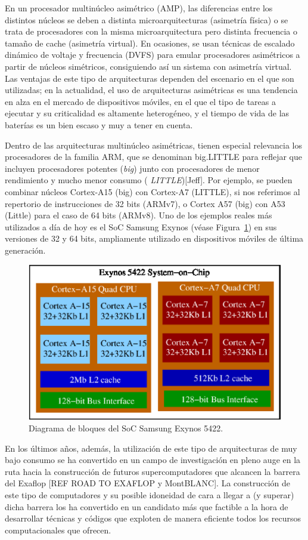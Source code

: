 En un procesador multinúcleo asimétrico (AMP), las diferencias entre los
distintos núcleos se deben a distinta microarquitecturas (asimetría física)
o se trata de procesadores con la misma microarquitectura pero distinta
frecuencia o tamaño de cache (asimetría virtual). En ocasiones, se usan
técnicas de escalado dinámico de voltaje y frecuencia (DVFS) para emular
procesadores asimétricos a partir de núcleos simétricos, consiguiendo así
un sistema con asimetría virtual. Las ventajas de este tipo de
arquitecturas dependen del escenario en el que son utilizadas; en la
actualidad, el uso de arquitecturas asimétricas es una tendencia en alza en
el mercado de dispositivos móviles, en el que el tipo de tareas a ejecutar y
su criticalidad es altamente heterogéneo, y el tiempo de vida de las
baterías es un bien escaso y muy a tener en cuenta.

Dentro de las arquitecturas multinúcleo asimétricas, tienen especial
relevancia los procesadores de la familia ARM, que se denominan big.LITTLE
para reflejar que incluyen procesadores potentes ({\em big}) junto con
procesadores de menor rendimiento y mucho menor consumo ({\em
  LITTLE})[Jeff]. Por ejemplo, se pueden combinar núcleos Cortex-A15 (big)
con Cortex-A7 (LITTLE), si nos referimos al repertorio de instrucciones de
32 bits (ARMv7), o Cortex A57 (big) con A53 (Little) para el caso de 64
bits (ARMv8). Uno de los ejemplos reales más utilizados a día de hoy es el
SoC Samsung Exynos (véase Figura~\ref{fig:exynos}) en sus versiones de 32 y
64 bits, ampliamente utilizado en dispositivos móviles de última
generación.

\begin{figure}[th!]
\begin{center}
\includegraphics[width=0.4\columnwidth]{Figures/Exynos.eps}
\end{center}
\caption{\label{fig:exynos} Diagrama de bloques del SoC Samsung Exynos 5422.}
\end{figure}

En los últimos años, además, la utilización de este tipo de arquitecturas de muy bajo consumo se ha
convertido en un campo de investigación en pleno auge en la ruta hacia la construcción de futuros
supercomputadores que alcancen la barrera del Exaflop [REF ROAD TO EXAFLOP y MontBLANC]. La construcción
de este tipo de computadores y su posible idoneidad de cara a llegar a (y superar) dicha barrera
los ha convertido en un candidato más que factible a la hora de desarrollar técnicas y códigos
que exploten de manera eficiente todos los recursos computacionales que ofrecen.

